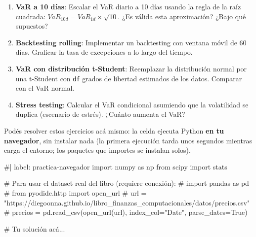 \documentclass[
  spanish,
  letterpaper,
  DIV=11,
  numbers=noendperiod]{scrreprt}
\newenvironment{Shaded}{\begin{snugshade}}{\end{snugshade}}
\newcommand{\NormalTok}[1]{\textcolor[rgb]{0.00,0.23,0.31}{#1}}
\begin{document}
\begin{tcolorbox}[enhanced jigsaw, bottomrule=.15mm, colback=white, opacitybacktitle=0.6, arc=.35mm, toprule=.15mm, opacityback=0, breakable, titlerule=0mm, left=2mm, coltitle=black, colbacktitle=quarto-callout-important-color!10!white, colframe=quarto-callout-important-color-frame, leftrule=.75mm, toptitle=1mm, bottomtitle=1mm, title=\textcolor{quarto-callout-important-color}{\faExclamation}\hspace{0.5em}{Ejercicios}, rightrule=.15mm]

\begin{enumerate}
\def\labelenumi{\arabic{enumi}.}
\item
  \textbf{VaR a 10 días}: Escalar el VaR diario a 10 días usando la
  regla de la raíz cuadrada: \(VaR_{10d} = VaR_{1d} \times \sqrt{10}\).
  ¿Es válida esta aproximación? ¿Bajo qué supuestos?
\item
  \textbf{Backtesting rolling}: Implementar un backtesting con ventana
  móvil de 60 días. Graficar la tasa de excepciones a lo largo del
  tiempo.
\item
  \textbf{VaR con distribución t-Student}: Reemplazar la distribución
  normal por una t-Student con \texttt{df} grados de libertad estimados
  de los datos. Comparar con el VaR normal.
\item
  \textbf{Stress testing}: Calcular el VaR condicional asumiendo que la
  volatilidad se duplica (escenario de estrés). ¿Cuánto aumenta el VaR?
\end{enumerate}

\end{tcolorbox}

Podés resolver estos ejercicios acá mismo: la celda ejecuta Python
\textbf{en tu navegador}, sin instalar nada (la primera ejecución tarda
unos segundos mientras carga el entorno; los paquetes que importes se
instalan solos).

\begin{Shaded}
\begin{Highlighting}[]
\NormalTok{\#| label: practica{-}navegador}
\NormalTok{import numpy as np}
\NormalTok{from scipy import stats}

\NormalTok{\# Para usar el dataset real del libro (requiere conexión):}
\NormalTok{\# import pandas as pd}
\NormalTok{\# from pyodide.http import open\_url}
\NormalTok{\# url = "https://diegoonna.github.io/libro\_finanzas\_computacionales/datos/precios.csv"}
\NormalTok{\# precios = pd.read\_csv(open\_url(url), index\_col="Date", parse\_dates=True)}

\NormalTok{\# Tu solución acá...}
\end{Highlighting}
\end{Shaded}
\end{document}
